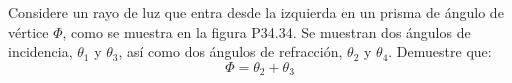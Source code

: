 \item Considere un rayo de luz que entra desde la izquierda en un prisma de ángulo de vértice $\Phi$, como se muestra en la figura P34.34. Se muestran dos ángulos de incidencia, $\theta_1$ y $\theta_3$, así como dos ángulos de refracción, $\theta_2$ y $\theta_4$. Demuestre que:
$$ \Phi = \theta_2 + \theta_3 $$